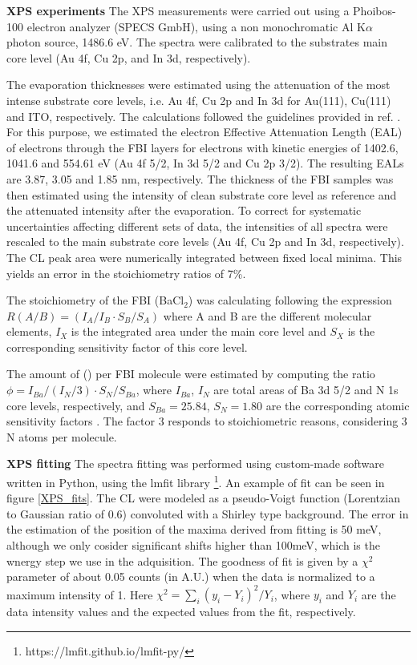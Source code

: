 \documentclass[aps,prl,reprint,longbibliography,superscriptaddress, english]{revtex4-1}
\def\BappCl{BaCl$_2$}
\begin{document}
\textbf{XPS experiments}
The XPS measurements were carried out using a Phoibos-100 electron analyzer (SPECS GmbH), using a non monochromatic Al K$\alpha$ photon source, 1486.6 eV. The spectra were calibrated to the substrates main core level (Au 4f, Cu 2p, and In 3d, respectively). 

The evaporation thicknesses were estimated using the attenuation of the most intense substrate core levels, i.e. Au 4f, Cu 2p and In 3d for Au(111), Cu(111) and ITO, respectively. The calculations followed the guidelines provided in ref. \cite{powell_practical_2020}. For this purpose, we estimated the electron Effective Attenuation Length (EAL) of electrons through the FBI layers for electrons with kinetic energies of 1402.6, 1041.6 and 554.61 eV (Au 4f 5/2, In 3d 5/2 and Cu 2p 3/2). The resulting EALs are 3.87, 3.05 and 1.85 nm, respectively. The thickness of the FBI samples was then estimated using the intensity of clean substrate core level as reference and the attenuated intensity after the evaporation. To correct for systematic uncertainties affecting different sets of data, the intensities of all spectra were rescaled to the main substrate core levels (Au 4f, Cu 2p and In 3d, respectively). The CL peak area were numerically integrated between fixed local minima. This yields an error in the stoichiometry ratios of 7\%. 

The stoichiometry of the FBI (\BappCl) was calculating following the expression $ R(A/B)=(I_{A}/I_{B} \cdot S_B/S_{A})$ where A and B are the different molecular elements, $I_{X}$ is the integrated area under the main core level and $S_{X}$ is the corresponding sensitivity factor of this core level.

The amount of \Bapp (\Nap) per FBI molecule were estimated by computing  the ratio $\phi=I_{Ba}/(I_N/3) \cdot S_N/S_{Ba} $, where $I_{Ba}$, $I_N$ are total areas  of Ba 3d 5/2 and  N 1s core  levels, respectively, and $S_{Ba} = 25.84$, $S_N = 1.80$ are the corresponding atomic sensitivity factors \cite{scofield_hartree-slater_1976}. The factor 3 responds to stoichiometric reasons, considering 3 N atoms per molecule.

\textbf{XPS fitting}
The spectra fitting was performed using custom-made software written in Python, using the lmfit library \footnote{https://lmfit.github.io/lmfit-py/}. An example of fit can be seen in figure \ref{XPS_fits}. The CL were modeled as a pseudo-Voigt function (Lorentzian to Gaussian ratio of 0.6) convoluted with a Shirley type background. The error in the estimation of the position of the maxima derived from fitting is 50 meV, although we only cosider significant shifts higher than 100meV, which is the wnergy step we use in the adquisition. The goodness of fit is given by a $\chi^2$ parameter of about 0.05 counts (in A.U.) when the data is normalized to a maximum intensity of 1. Here $\chi^2 = \sum_i (y_i- Y_i)^2/Y_i$, where $y_i$ and $Y_i$ are the data intensity values and the expected values from the fit, respectively.
\end{document}
